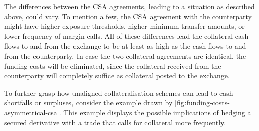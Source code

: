 \documentclass[main.tex]{subfiles}
\begin{document}
        The differences between the CSA agreements, leading to a situation as described above, could vary. 
        To mention a few, the CSA agreement with the counterparty might have higher exposure thresholds, 
        higher minimum transfer amounts, or lower frequency of margin calls.
        All of these differences lead the collateral cash flows to and from the exchange 
        to be at least as high as the cash flows to and from the counterparty. 
        In case the two collateral agreements are identical, the funding costs will be eliminated, 
        since the collateral received from the counterparty will completely suffice as collateral posted to the exchange.        

        To further grasp how unaligned collateralisation schemes can lead to cash shortfalls or surpluses, 
        consider the example drawn by \cref{fig:funding-costs-asymmetrical-csa}.
        This example displays the possible implications of hedging a secured derivative
        with a trade that calls for collateral more frequently.
\end{document}
